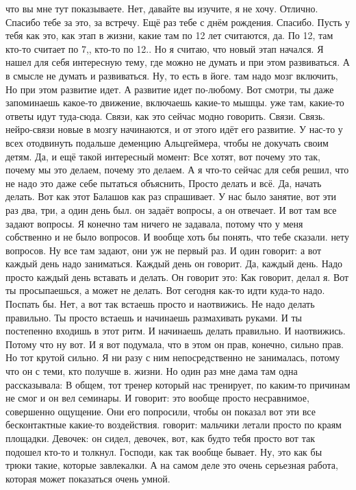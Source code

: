 что вы мне тут показываете.
Нет, давайте вы изучите, я не хочу.
Отлично.
Спасибо тебе за это, за встречу.
Ещё раз тебе с днём рождения.
Спасибо.
Пусть у тебя как это, как этап в жизни, какие там по 12 лет считаются, да.
По 12, там кто-то считает по 7,, кто-то по 12..
Но я считаю, что новый этап начался. Я нашел для себя интересную тему, где можно не думать и при этом развиваться.
А в смысле не думать и развиваться.
Ну, то есть в йоге. там надо мозг включить, Но при этом развитие идет.
А развитие идет по-любому.
Вот смотри, ты даже запоминаешь какое-то движение, включаешь какие-то мышцы. уже там, какие-то ответы идут туда-сюда.
Связи, как это сейчас модно говорить.
Связи.
Связь.
нейро-связи новые в мозгу начинаются, и от этого идёт его развитие.
У нас-то у всех отодвинуть подальше деменцию Альцгеймера, чтобы не докучать своим детям.
Да, и ещё такой интересный момент: Все хотят, вот почему это так, почему мы это делаем, почему это делаем. А я что-то сейчас для себя решил, что не надо это даже себе пытаться объяснить, Просто делать и всё.
Да, начать делать.
Вот как этот Балашов как раз спрашивает.
У нас было занятие, вот эти раз два, три, а один день был. он задаёт вопросы, а он отвечает.
И вот там все задают вопросы.
Я конечно там ничего не задавала, потому что у меня собственно и не было вопросов.
И вообще хоть бы понять, что тебе сказали. нету вопросов.
Ну все там задают, они уж не первый раз.
И один говорит: а вот каждый день надо заниматься.
Каждый день он говорит.
Да, каждый день.
Надо просто каждый день вставать и делать.
Он говорит это:
Как говорит, делал я.
Вот ты просыпаешься, а может не делать.
Вот сегодня как-то идти куда-то надо.
Поспать бы.
Нет, а вот так встаешь просто и наотвижись.
Не надо делать правильно.
Ты просто встаешь и начинаешь размахивать руками.
И ты постепенно входишь в этот ритм.
И начинаешь делать правильно.
И наотвижись.
Потому что ну вот.
И я вот подумала, что в этом он прав, конечно, сильно прав.
Но тот крутой сильно.
Я ни разу с ним непосредственно не занималась, потому что он
с теми, кто получше в.
жизни.
Но один раз мне дама там одна рассказывала:
В общем, тот тренер который нас тренирует, по каким-то причинам не смог и он вел семинары.
И говорит: это вообще просто несравнимое, совершенно ощущение.
Они его попросили, чтобы он показал вот эти все бесконтактные какие-то воздействия.
говорит: мальчики летали просто по краям площадки.
Девочек: он сидел, девочек, вот, как будто тебя просто вот так подошел кто-то и толкнул.
Господи, как так вообще бывает.
Ну, это как бы трюки такие, которые завлекалки.
А на самом деле это очень серьезная работа, которая может показаться очень умной.
